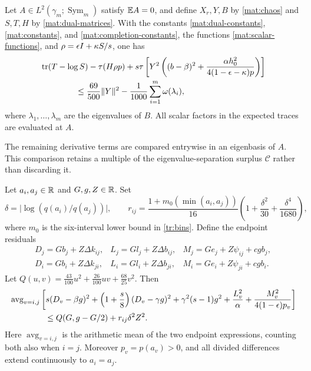\begin{proposition}
\label{mat:scalar-absorption}
Let $A\in L^2(\gamma_m;\operatorname{Sym}_m)$ satisfy $\mathbb E A=0$, and
define $X_r,Y,B$ by \eqref{mat:chaos} and $S,T,H$ by
\eqref{mat:dual-matrices}.  With the constants
\eqref{mat:dual-constants}, \eqref{mat:constants}, and
\eqref{mat:completion-constants}, the functions \eqref{mat:scalar-functions}, and
$\rho=\epsilon I+\kappa S/s$, one has
\begin{equation}\label{mat:absorption-inequality}
 \begin{split}
 &\tr(T-\log S)-\tau(H\rho p)
 +s\tau\left[Y^2\left((b-\beta)^2+
       \frac{\alpha h_0^2}{4(1-\epsilon-\kappa)p}\right)\right]\\
 &\hspace{15mm}\le\frac{69}{500}\|Y\|^2
       -\frac1{1000}\sum_{i=1}^m\omega(\lambda_i),
 \end{split}
\end{equation}
where $\lambda_1,\ldots,\lambda_m$ are the eigenvalues of $B$.
All scalar factors in the expected traces are evaluated at $A$.
\end{proposition}

The remaining derivative terms are compared entrywise in an eigenbasis
of $A$.  This comparison retains a multiple of the eigenvalue-separation
surplus $\mathcal C$ rather than discarding it.

\begin{proposition}\label{mat:scalar-pair}
Let $a_i,a_j\in\mathbb R$ and $G,g,Z\in\mathbb R$.  Set
\[
 \delta=\bigl|\log(q(a_i)/q(a_j))\bigr|,\qquad
 r_{ij}=\frac{1+m_0(\min(a_i,a_j))}{16}
       \left(1+\frac{\delta^2}{30}+\frac{\delta^4}{1680}\right),
\]
where $m_0$ is the six-interval lower bound in \eqref{tr:bins}.  Define the endpoint residuals
\[
 \begin{array}{lll}
 D_j=Gb_j+Z\Delta k_{ij},&L_j=Gl_j+Z\Delta b_{ij},&
 M_j=Ge_j+Z\psi_{ij}+cgb_j,\\
 D_i=Gb_i+Z\Delta k_{ji},&L_i=Gl_i+Z\Delta b_{ji},&
 M_i=Ge_i+Z\psi_{ji}+cgb_i.
 \end{array}
\]
Let
$Q(u,v)=\frac{43}{100}u^2+\frac{26}{100}uv+\frac{68}{25}v^2$.
Then
\begin{align}
 &\operatorname{avg}_{v=i,j}\left[
 s(D_v-\beta g)^2+\left(1+\frac s8\right)(D_v-\gamma g)^2
 +\gamma^2(s-1)g^2+\frac{L_v^2}{\alpha}
 +\frac{M_v^2}{4(1-\epsilon)p_v}\right]\notag\\
 &\hspace{15mm}\le Q(G,g-G/2)+r_{ij}\delta^2Z^2.
 \label{mat:pair-inequality}
\end{align}
Here $\operatorname{avg}_{v=i,j}$ is the arithmetic mean of the two
endpoint expressions, counting both also when $i=j$.  Moreover
$p_v=p(a_v)>0$, and all divided differences extend continuously to
$a_i=a_j$.
\end{proposition}


